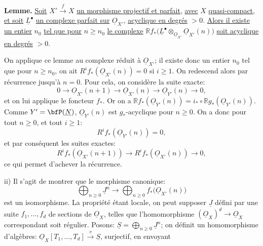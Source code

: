 
\textbf{Lemme.} \uline{Soit} \(X'\xrightarrow{f}X\) \uline{un morphisme projectif et parfait}, \uline{avec} \(X\) \uline{quasi-compact}, \uline{et soit} \(\underline{L}^\bullet\) \uline{un complexe parfait sur} \(\underline{O}_{X'}\), \uline{acyclique en degrés} \(>0\). \uline{Alors il existe un entier} \(n_0\) \uline{tel que pour} \(n\ge n_0\) \uline{le complexe} \(\mathbb Rf_*\bigl(\underline{L}^\bullet\otimes_{\underline{O}_{X'}}\underline{O}_{X'}(n)\bigr)\) \uline{soit acyclique en degrés} \(>0\).

On applique ce lemme au complexe réduit à \(\underline{O}_{X'}\); il existe donc un entier \(n_0\) tel que pour \(n\ge n_0\), on ait \(R^if_*(\underline{O}_{X'}(n))=0\) si \(i\ge1\). On redescend alors par récurrence jusqu'à \(n=0\). Pour cela, on considère la suite exacte:
\[
0\longrightarrow
\underline{O}_{X'}(n+1)
\longrightarrow
\underline{O}_{X'}(n)
\longrightarrow
\underline{O}_{Y'}(n)
\longrightarrow0,
\]
et on lui applique le foncteur \(f_*\). Or on a \(\mathbb Rf_*(\underline{O}_{Y'}(n))=i_*\circ\mathbb Rg_*(\underline{O}_{Y'}(n))\). Comme \(Y'=\bfP(\underline{N})\), \(\underline{O}_{Y'}(n)\) est \(g_*\)-acyclique pour \(n\ge0\). On a donc pour tout \(n\ge0\), et tout \(i\ge1\):
\[
R^if_*(\underline{O}_{Y'}(n))=0,
\]
et par conséquent les suites exactes:
\[
R^if_*(\underline{O}_{X'}(n+1))
\longrightarrow
R^if_*(\underline{O}_{X'}(n))
\longrightarrow0,
\]
ce qui permet d'achever la récurrence.

ii) Il s'agit de montrer que le morphisme canonique:
\[
\bigoplus_{n\ge0}\underline{J}^n
\longrightarrow
\bigoplus_{n\ge0}f_*\bigl(\underline{O}_{X'}(n)\bigr)
\]
est un isomorphisme. La propriété étant locale, on peut supposer \(\underline{J}\) défini par une suite \(f_1,\ldots,f_d\) de sections de \(\underline{O}_X\), telles que l'homomorphisme \((\underline{O}_X)^d\longrightarrow\underline{O}_X\) correspondant soit régulier. Posons: \(\underline{S}=\bigoplus_{n\ge0}\underline{J}^n\); on définit un homomorphisme d'algèbres: \(\underline{O}_X[T_1,\ldots,T_d]\xrightarrow{v}\underline{S}\), surjectif, en envoyant 
